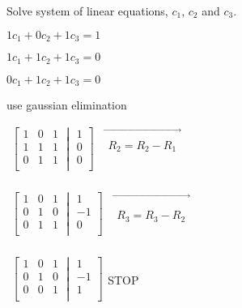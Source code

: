 \documentclass{extarticle}
\begin{document}
\begin{multicols}{2}
Solve system of linear equations, $c_1$, $c_2$ and $c_3$.

$1c_1+0c_2+1c_3=1$

$1c_1+1c_2+1c_3=0$

$0c_1+1c_2+1c_3=0$

use gaussian elimination


$\begin{matrix}\left[\begin{matrix}1&0&1\\1&1&1\\0&1&1\\\end{matrix}\middle|\begin{matrix}1\\0\\0\\\end{matrix}\right]&\vec{\begin{matrix}\\R_2=R_2-R_1\\ \\\end{matrix}}\\\end{matrix}$

$\begin{matrix}\left[\begin{matrix}1&0&1\\0&1&0\\0&1&1\\\end{matrix}\middle|\begin{matrix}1\\-1\\0\\\end{matrix}\right]&\vec{\begin{matrix}\\ \\R_3=R_3-R_2\\\end{matrix}}\\\end{matrix}$

$\begin{matrix}\left[\begin{matrix}1&0&1\\0&1&0\\0&0&1\\\end{matrix}\middle|\begin{matrix}1\\-1\\1\\\end{matrix}\right]\\\end{matrix}$STOP


\end{multicols}
\end{document}
